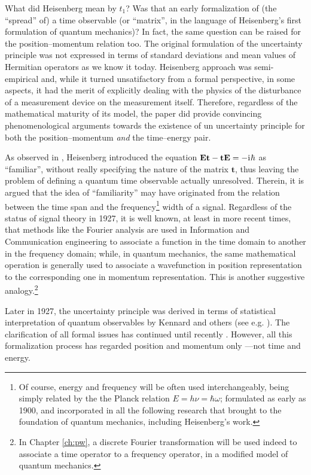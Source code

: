 What did Heisenberg mean by $t_1$? Was that an early formalization of (the ``spread'' of)
a time observable (or ``matrix'', in the language of Heisenberg's first formulation of quantum mechanics)?
In fact, the same question can be raised for the position--momentum
relation too. The original formulation of the uncertainty principle
was not expressed in terms of standard deviations and mean values of Hermitian operators
as we know it today. Heisenberg approach was semi-empirical and,
while it turned unsatifactory from a formal perspective, in some aspects,
it had the merit of explicitly dealing with the physics of the disturbance
of a measurement device on the measurement itself. Therefore,
regardless of the mathematical maturity of its model,
the paper did provide convincing phenomenological arguments towards
the existence of un uncertainty principle for both the position--momentum
\emph{and} the time--energy pair.

As observed in \cite[sec.1.1.3]{TQM1}, Heisenberg introduced the equation
$\mathbf{Et}-\mathbf{tE} = -\mathrm{i}\mkern1mu\hbar$
as ``familiar'', without really specifying the nature of the matrix $\mathbf{t}$,
thus leaving the problem of defining a quantum time observable actually unresolved.
Therein, it is argued that the idea of ``familiarity'' may have originated from the
relation between
the time span and the frequency\footnote{
  Of course, energy and frequency will be often used interchangeably,
  being
  simply related by the the Planck relation $E = h\nu = \hbar\omega$;
  formulated as early as 1900, and incorporated in all the following research
  that brought to the foundation of quantum mechanics, including Heisenberg's work.
}
width of a signal. Regardless of the status
of signal theory in 1927, it is well known, at least in more recent times, that
methods like the Fourier analysis are used in Information and Communication engineering to associate a function in the time domain
to another in the frequency domain; while, in quantum mechanics, the same mathematical operation
is generally used to associate a wavefunction in position representation to
the corresponding one in momentum representation.
This is another suggestive analogy.\footnote{
  In Chapter \ref{ch:pw}, a discrete Fourier transformation will be used indeed to
  associate a time operator to a frequency operator,
  in a modified model of quantum mechanics.
}

Later in 1927, the uncertainty principle was derived in terms of
statistical interpretation of quantum observables
by Kennard and others (see e.g. \cite{Kennard1927}).
The clarification of all formal issues has continued until recently \parencite{Appleby}.
However, all this formalization process has regarded position and momentum only
---not time and energy.

